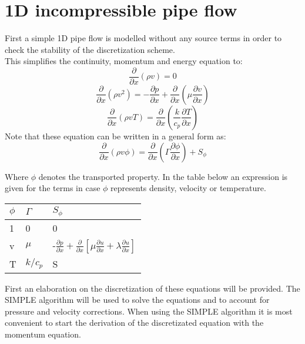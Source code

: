 \section{1D incompressible pipe flow}
First a simple 1D pipe flow is modelled without any source terms in order to check the stability of the discretization scheme. \\
This simplifies the continuity, momentum and energy equation to:
\begin{equation}
	\frac{\partial}{\partial x} (\rho v) = 0
\end{equation}
\begin{equation}
\frac{\partial}{\partial x} (\rho v^2) = -\frac{\partial p}{\partial x} + \frac{\partial}{\partial x}\left(\mu \frac{\partial v}{\partial x}\right)
\end{equation}
\begin{equation}
	\frac{\partial}{\partial x}(\rho v T) =\frac{ \partial}{\partial x}\left(\frac{k}{c_p}\frac{\partial T}{\partial x}\right)
\end{equation}
Note that these equation can be written in a general form as:
\begin{equation}
\frac{\partial}{\partial x }(\rho v \phi) = \frac{\partial}{\partial x}\left(\Gamma \frac{\partial \phi}{\partial x}\right) + S_\phi
\end{equation}

Where $\phi$ denotes the transported property. In the table below an expression is given for the terms in case $\phi$ represents density, velocity or temperature. 
\begin{table}[H]
	\begin{tabular}{|l|l|l|}
		\hline
		$\phi$ 	& $\Gamma$ 	& $S_\phi$        \\ \hline
		1   	& 0     	& 0        \\
		v   	& $\mu$    	& -$\frac{\partial p}{\partial x} +\frac{\partial}{\partial x}\left[\mu \frac{\partial u}{\partial x}+\lambda  \frac{\partial u}{\partial x} \right]$\\
		T   	& $k/c_p$   & S    \\ \hline  
	\end{tabular}
\end{table}
First an elaboration on the discretization of these equations will be provided. The SIMPLE algorithm will be used to solve the equations and to account for pressure and velocity corrections. When using the SIMPLE algorithm it is most convenient to start the derivation of the discretizated equation with the momentum equation.  

